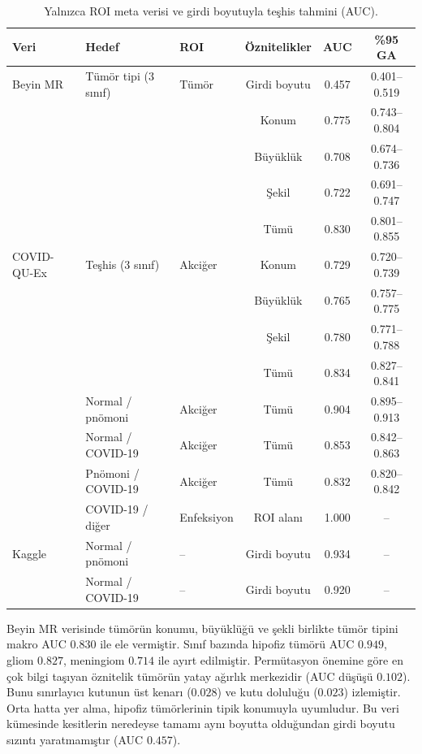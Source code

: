 \begin{table}[h!]
{\setlength{\tabcolsep}{4pt}
\caption{Yalnızca ROI meta verisi ve girdi boyutuyla teşhis tahmini (AUC).}
\begin{center}
\vspace{-6mm}
\begin{tabular}{lllccc}
\hline\hline
Veri & Hedef & ROI & Öznitelikler & AUC & \%95 GA \\
\hline
Beyin MR & Tümör tipi (3 sınıf) & Tümör & Girdi boyutu & 0.457 & 0.401--0.519 \\
 & & & Konum & 0.775 & 0.743--0.804 \\
 & & & Büyüklük & 0.708 & 0.674--0.736 \\
 & & & Şekil & 0.722 & 0.691--0.747 \\
 & & & Tümü & 0.830 & 0.801--0.855 \\
\hline
COVID-QU-Ex & Teşhis (3 sınıf) & Akciğer & Konum & 0.729 & 0.720--0.739 \\
 & & & Büyüklük & 0.765 & 0.757--0.775 \\
 & & & Şekil & 0.780 & 0.771--0.788 \\
 & & & Tümü & 0.834 & 0.827--0.841 \\
 & Normal / pnömoni & Akciğer & Tümü & 0.904 & 0.895--0.913 \\
 & Normal / COVID-19 & Akciğer & Tümü & 0.853 & 0.842--0.863 \\
 & Pnömoni / COVID-19 & Akciğer & Tümü & 0.832 & 0.820--0.842 \\
 & COVID-19 / diğer & Enfeksiyon & ROI alanı & 1.000 & -- \\
\hline
Kaggle & Normal / pnömoni & -- & Girdi boyutu & 0.934 & -- \\
 & Normal / COVID-19 & -- & Girdi boyutu & 0.920 & -- \\
\hline
\end{tabular}
\vspace{-6mm}
\end{center}
\label{tbl:saldiriA}}
\end{table}

Beyin MR verisinde tümörün konumu, büyüklüğü ve şekli birlikte tümör tipini makro AUC $0.830$ ile ele vermiştir. Sınıf bazında hipofiz tümörü AUC $0.949$, gliom $0.827$, meningiom $0.714$ ile ayırt edilmiştir. Permütasyon önemine göre en çok bilgi taşıyan öznitelik tümörün yatay ağırlık merkezidir (AUC düşüşü $0.102$). Bunu sınırlayıcı kutunun üst kenarı ($0.028$) ve kutu doluluğu ($0.023$) izlemiştir. Orta hatta yer alma, hipofiz tümörlerinin tipik konumuyla uyumludur. Bu veri kümesinde kesitlerin neredeyse tamamı aynı boyutta olduğundan girdi boyutu sızıntı yaratmamıştır (AUC $0.457$).

